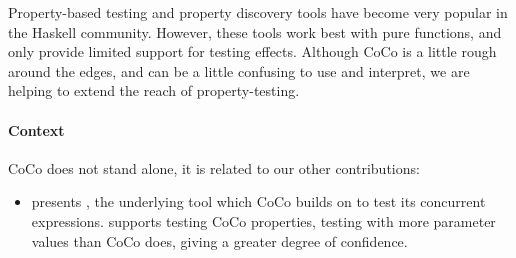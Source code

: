 Property-based testing and property discovery tools have become very
popular in the Haskell community.  However, these tools work best with
pure functions, and only provide limited support for testing effects.
Although CoCo is a little rough around the edges, and can be a little
confusing to use and interpret, we are helping to extend the reach of
property-testing.

\paragraph{Context}
CoCo does not stand alone, it is related to our other contributions:

\begin{itemize}
\item {} presents \dejafu{}, the underlying tool which
  CoCo builds on to test its concurrent expressions.  \dejafu{}
  supports testing CoCo properties, testing with more parameter values
  than CoCo does, giving a greater degree of confidence.
\end{itemize}


